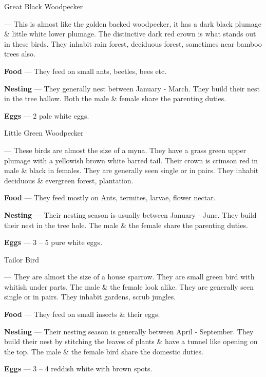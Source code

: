 \begin{bird}{Great Black Woodpecker}

 --- This is almost like the golden backed woodpecker, it has a dark black plumage \& little white lower plumage. The distinctive dark red crown is what stands out in these birds. They  inhabit rain forest, deciduous forest, sometimes near bamboo trees also.

{\large\bf Food} --- They feed on small ants, beetles, bees etc.

{\large\bf Nesting} --- They generally nest between January - March. They build their nest in the tree hallow. Both the male \& female share the parenting duties.

{\large\bf Eggs} --- 2 pale white eggs.
\end{bird}

\begin{bird}{Little Green Woodpecker}

 --- These birds are almost the size of a myna. They have a grass green upper plumage with a yellowish brown white barred tail. Their crown is crimson red in male \& black in females. They are generally seen single or in pairs. They inhabit deciduous \& evergreen forest, plantation.

{\large\bf Food} --- They feed mostly on Ants, termites, larvae, flower nectar.

{\large\bf Nesting} --- Their nesting season is usually between January - June. They  build their nest in the tree hole. The male \& the female share the parenting duties.

{\large\bf Eggs} --- 3 -- 5 pure white eggs.
\end{bird}

\begin{bird}{Tailor Bird}

 --- They are almost the size of a house sparrow. They are small green bird with whitish under parts. The male \& the female look alike. They are generally seen single or in pairs. They inhabit gardens, scrub jungles.

{\large\bf Food} --- They feed on small insects \& their eggs.

{\large\bf Nesting} --- Their nesting season is generally between April - September. They build their nest by stitching the leaves of plants \& have a tunnel like opening on the top. The male \& the female bird share the domestic duties.

{\large\bf Eggs} --- 3 -- 4 reddish white with brown spots.
\end{bird}

